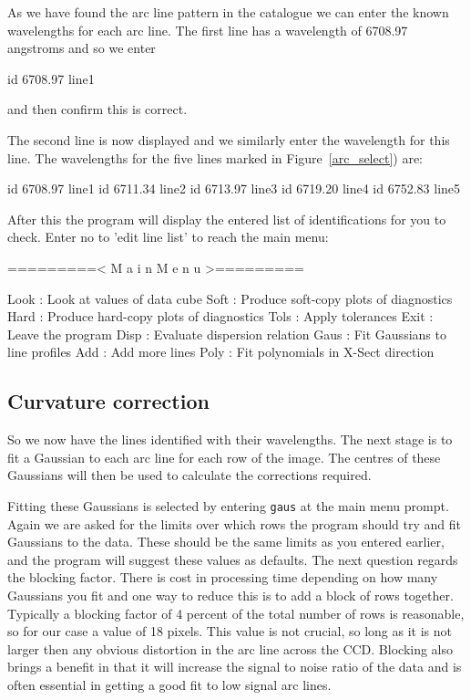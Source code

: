 \documentclass[twoside,11pt]{starlink}
\providecommand{\scspec}[2]{#1}
\begin{document}
As we have found the arc line pattern in the catalogue we can enter
the known wavelengths for each arc line. The first line has a
wavelength of 6708.97 angstroms and so we enter

{\scspec{\small}{ }
\begin{terminalv}
id 6708.97 line1
\end{terminalv}
}
and then confirm this is correct.

The second line is now displayed and we similarly enter the wavelength
for this line. The wavelengths for the five lines marked in
\scspec{Figure~\ref{arc_select}}{the figure above}) are:

{\scspec{\small}{ }
\begin{terminalv}
id 6708.97 line1
id 6711.34 line2
id 6713.97 line3
id 6719.20 line4
id 6752.83 line5
\end{terminalv}
}

After this the program will display the entered list of
identifications for you to check. Enter no to 'edit line list' to
reach the main menu:

{\scspec{\small}{ }
\begin{terminalv}
=========< M a i n   M e n u >=========

Look : Look at values of data cube
Soft : Produce soft-copy plots of diagnostics
Hard : Produce hard-copy plots of diagnostics
Tols : Apply tolerances
Exit : Leave the program
Disp : Evaluate dispersion relation
Gaus : Fit Gaussians to line profiles
Add  : Add more lines
Poly : Fit polynomials in X-Sect direction
\end{terminalv}
}

\subsection{Curvature correction}

So we now have the lines identified with their wavelengths. The next
stage is to fit a Gaussian to each arc line for each row of the image.
The centres of these Gaussians will then be used to calculate the
corrections required.

Fitting these Gaussians is selected by entering \texttt{gaus} at the main
menu prompt. Again we are asked for the limits over which rows the
program should try and fit Gaussians to the data. These should be the
same limits as you entered earlier, and the program will suggest these
values as defaults. The next question regards the blocking factor.
There is cost in processing time depending on how many Gaussians you
fit and one way to reduce this is to add a block of rows together.
Typically a blocking factor of 4 percent of the total number of rows
is reasonable, so for our case a value of 18 pixels. This value is not
crucial, so long as it is not larger then any obvious distortion in
the arc line across the CCD. Blocking also brings a benefit in that it
will increase the signal to noise ratio of the data and is often
essential in getting a good fit to low signal arc lines.
\end{document}

